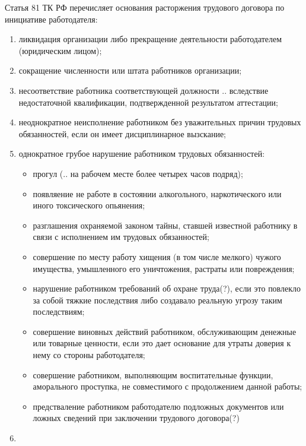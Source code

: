 Статья 81 ТК РФ перечисляет основания расторжения трудового договора по инициативе работодателя:
\begin{enumerate}
	\item ликвидация организации либо прекращение деятельности работодателем (юридическим лицом);
	\item сокращение численности или штата работников организации;
	\item несоответствие работника соответствующей должности .. вследствие недостаточной квалификации, подтвержденной результатом аттестации;
	\item неоднократное неисполнение работником без уважительных причин трудовых обязанностей, если он имеет дисциплинарное вызскание;
	\item однократное грубое нарушение работником трудовых обязанностей:
	\begin{itemize}
		\item прогул (.. на рабочем месте более четырех часов подряд);
		\item появляение не работе в состоянии алкогольного, наркотического или иного токсического опьянения;
		\item разглашения охраняемой законом тайны, ставшей известной работнику в связи с исполнением им трудовых обязанностей;
		\item совершение по месту работу хищения (в том числе мелкого) чужого имущества, умышленного его уничтожения, растраты или повреждения;
		\item нарушение работником требований об охране труда(?), если это повлекло за собой тяжкие последствия либо создавало реальную угрозу таким последствиям;
		\item совершение виновных действий работником, обслуживающим денежные или товарные ценности, если это дает основание для утраты доверия к нему со стороны работодателя;
		\item совершение работником, выполняющим воспитательные функции, аморального проступка, не совместимого с продолжением данной работы;
		\item предстваление работником работодателю подложных документов или ложных сведений при заключении трудового договора(?) 
	\end{itemize} 
	\item
\end{enumerate}

